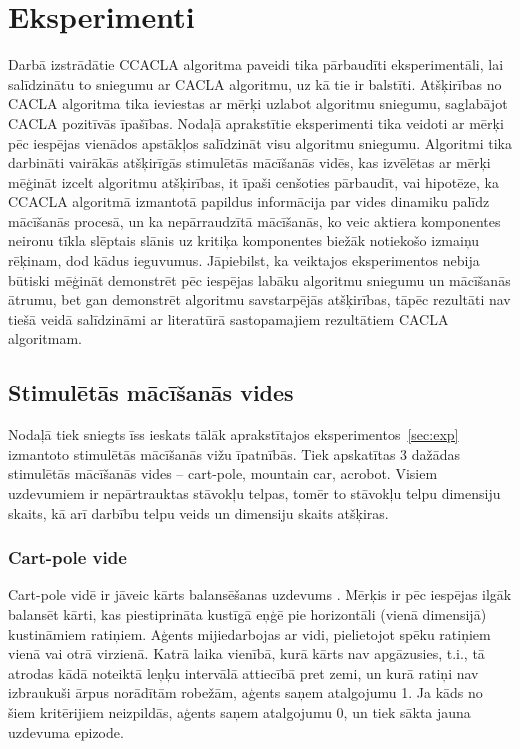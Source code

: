 \documentclass{ludis} %
\begin{document}
\chapter{Eksperimenti}
Darbā izstrādātie CCACLA algoritma paveidi tika pārbaudīti eksperimentāli, lai
salīdzinātu to sniegumu ar CACLA algoritmu, uz kā tie ir balstīti. Atšķirības no
CACLA algoritma tika ieviestas ar mērķi uzlabot algoritmu sniegumu, saglabājot
CACLA pozitīvās īpašības. Nodaļā aprakstītie eksperimenti tika veidoti ar mērķi
pēc iespējas vienādos apstākļos salīdzināt visu algoritmu sniegumu. Algoritmi
tika darbināti vairākās atšķirīgās stimulētās mācīšanās vidēs, kas izvēlētas ar
mērķi mēģināt izcelt algoritmu atšķirības, it īpaši cenšoties pārbaudīt, vai
hipotēze, ka CCACLA algoritmā izmantotā papildus informācija par vides dinamiku
palīdz mācīšanās procesā, un ka nepārraudzītā mācīšanās, ko veic aktiera
komponentes neironu tīkla slēptais slānis uz kritiķa komponentes biežāk
notiekošo izmaiņu rēķinam, dod kādus ieguvumus. Jāpiebilst, ka veiktajos
eksperimentos nebija būtiski mēģināt demonstrēt pēc iespējas labāku algoritmu
sniegumu un mācīšanās ātrumu, bet gan demonstrēt algoritmu savstarpējās
atšķirības, tāpēc rezultāti nav tiešā veidā salīdzināmi ar literatūrā
sastopamajiem rezultātiem CACLA algoritmam.

\section{Stimulētās mācīšanās vides}
Nodaļā tiek sniegts īss ieskats tālāk aprakstītajos eksperimentos~\ref{sec:exp}
izmantoto stimulētās mācīšanās vižu īpatnībās. Tiek apskatītas 3 dažādas
stimulētās mācīšanās vides -- cart-pole, mountain car, acrobot.
Visiem uzdevumiem ir nepārtrauktas stāvokļu telpas, tomēr to stāvokļu telpu
dimensiju skaits, kā arī darbību telpu veids un dimensiju skaits atšķiras.

\subsection{Cart-pole vide}
Cart-pole vidē ir jāveic kārts balansēšanas uzdevums \autocite{Barto}. Mērķis ir
pēc iespējas ilgāk balansēt kārti, kas piestiprināta kustīgā eņģē pie
horizontāli (vienā dimensijā) kustināmiem ratiņiem. Aģents mijiedarbojas ar vidi,
pielietojot spēku ratiņiem vienā vai otrā virzienā. Katrā laika vienībā, kurā
kārts nav apgāzusies, t.i., tā atrodas kādā noteiktā leņķu intervālā attiecībā
pret zemi, un kurā ratiņi nav izbraukuši ārpus norādītām robežām, aģents saņem
atalgojumu 1. Ja kāds no šiem kritērijiem neizpildās, aģents saņem atalgojumu 0,
un tiek sākta jauna uzdevuma epizode.
\end{document}
